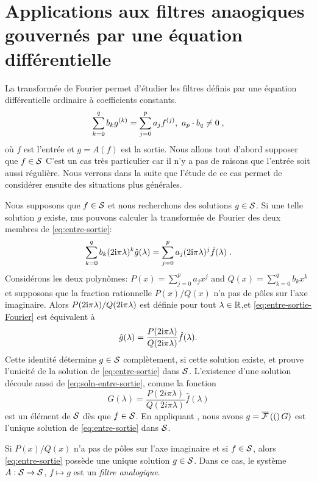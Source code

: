 \section{Applications aux filtres anaogiques gouvern\'es par une \'equation diff\'erentielle}
La transform\'ee de Fourier permet d'\'etudier les filtres d\'efinis par une \'equation diff\'erentielle ordinaire à coefficients constants.
\begin{equation}
\label{eq:entre-sortie}
\sum_{k=0}^{q}b_{k}g^{(k)}=\sum_{j=0}^{p}a_{j}f^{(j)},\ a_{p}\cdot b_{q}\neq 0 \;,
\end{equation}
où $f$ est l'entr\'ee et $g=A(f)$ est la sortie. Nous allons tout d'abord supposer que $f \in \mathcal{S}$
C'est un cas tr\`es particulier car il n'y a pas de raisons que l'entr\'ee soit aussi r\'eguli\`ere. Nous verrons dans la suite que l'\'etude de ce cas permet de consid\'erer ensuite des situations plus g\'en\'erales.

Nous supposons que $f\in \mathcal{S}$ et nous recherchons des solutions $g \in \mathcal{S}$. 
Si une telle solution $g$ existe, nus pouvons calculer la transform\'ee de Fourier des deux membres de \eqref{eq:entre-sortie}:
\begin{equation}
\label{eq:entre-sortie-Fourier}
\sum_{k=0}^{q}b_{k}(2\mathrm{i}\pi\lambda)^{k}\hat{g}(\lambda)=\sum_{j=0}^{p}a_{j}(2\mathrm{i} \pi\lambda)^{j}\hat{f}(\lambda) \;. 
\end{equation}
Consid\'erons les deux polyn\^omes: $P(x)=\displaystyle \sum_{j=0}^{p}a_{j}x^{j}$ and $Q(x)=\displaystyle \sum_{k=0}^{q}b_{k}x^{k}$
et supposons que la fraction rationnelle $P(x)/Q(x)$ n'a pas de p\^oles sur l'axe imaginaire.
Alors $P(2 \mathrm{i} \pi\lambda)/Q(2 \mathrm{i} \pi\lambda)$ est d\'efinie pour tout $\lambda \in \mathbb{R}$,et \eqref{eq:entre-sortie-Fourier}
est \'equivalent à
\begin{equation}
\label{eq:soln-entre-sortie}
\hat{g}(\lambda)=\frac{P(2\mathrm{i}\pi\lambda)}{Q(2\mathrm{i}\pi\lambda)}\hat{f}(\lambda). 
\end{equation}
Cette identit\'e d\'etermine $g \in \mathcal{S}$ compl\`etement, si cette solution existe, et prouve l'unicit\'e de la solution de \eqref{eq:entre-sortie} dans $\mathcal{S}$. L'existence d'une solution d\'ecoule aussi de \eqref{eq:soln-entre-sortie}, comme la fonction
$$
G(\lambda)=\frac{P(2i\pi\lambda)}{Q(2i\pi\lambda)}\hat{f}(\lambda)
$$
est un \'el\'ement de $\mathcal{S}$ d\`es que  $f \in \mathcal{S}$.
En appliquant , nous avons $g= \overline{\mathcal{F}}\left( ( \right)G)$ est l'unique solution de \eqref{eq:entre-sortie} dans $\mathcal{S}$.

\begin{proposition}
 Si $P(x)/Q(x)$ n'a pas de p\^oles sur l'axe imaginaire et si $f \in \mathcal{S}$, alors \eqref{eq:entre-sortie} poss\`ede une unique solution $g\in \mathcal{S}$. Dans ce cas, le syst\`eme $A:\mathcal{S} \to \mathcal{S}$, $f\mapsto g$ est un \emph{filtre analogique}.
 \end{proposition}
